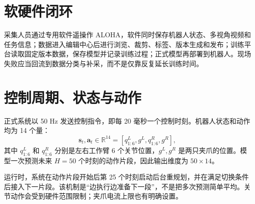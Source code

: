 \section{软硬件闭环}


采集人员通过专用软件遥操作 ALOHA，软件同时保存机器人状态、多视角视频和任务信息；数据进入编辑中心后进行浏览、裁剪、标签、版本生成和发布；训练平台读取固定版本数据，保存模型并记录训练过程；正式模型再部署到机器人。现场失败应当回流到数据分类与补采，而不是仅靠反复延长训练时间。

\section{控制周期、状态与动作}

正式系统以 50 Hz 发送控制指令，即每 20 毫秒一个控制时刻。机器人状态和动作均为 14 个量：
\[
\mathbf{s}_t,\mathbf{a}_t\in\mathbb{R}^{14}
=[q^L_{1:6},g^L,q^R_{1:6},g^R],
\]
其中 $q^L_{1:6}$ 和 $q^R_{1:6}$ 分别是左右工作臂 6 个关节位置，$g^L,g^R$ 是两只夹爪的位置。模型一次预测未来 $H=50$ 个时刻的动作片段，因此输出维度为 $50\times14$。


运行时，系统在动作片段开始后第 25 个时刻启动后台重规划，并在满足切换条件后接入下一片段。该机制是“边执行边准备下一段”，不是把多次预测简单平均。关节动作会受到硬件范围限制；夹爪电流上限也有明确设置。

